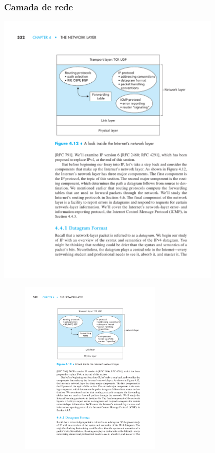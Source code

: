 \documentclass[xcolor=dvipsnames,10pt,compress,aspectratio=169]{beamer}
\begin{document}
\begin{frame}
  \frametitle{Camada de rede}
{
  \centering
  \includegraphics[width=0.8\textwidth]{kurose-04-01}
}
{
  \begin{figure}[ht]
  \centering
  \includegraphics[width=0.6\textwidth]{kurose-04-01}
  \end{figure}
}
\end{frame}
\end{document}
